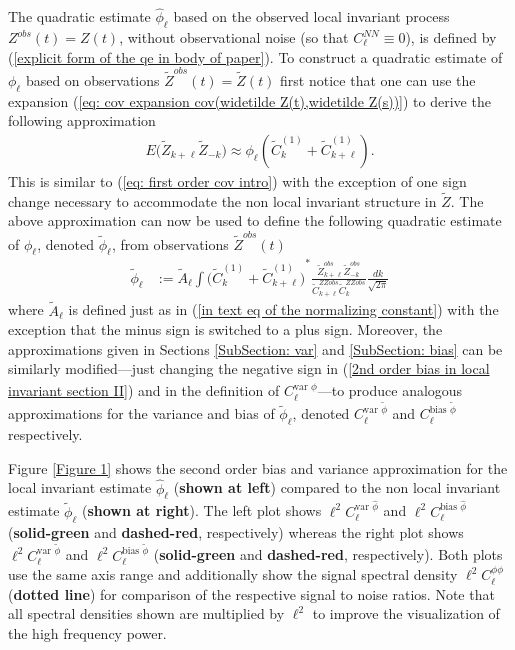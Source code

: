 \documentclass[10pt,noinfoline]{imsart}
\newcommand{\bs}{\boldsymbol}
\begin{document}
The quadratic estimate $\hat\phi_{\ell}$ based on the observed local invariant process $Z^{obs}(t)= Z(t)$, without observational noise (so that $C^{N\!N}_{\ell}\equiv 0$), is defined by (\ref{explicit form of the qe in body of paper}). To construct a quadratic estimate of $\phi_\ell$ based on observations $\widetilde Z^{obs}(t) = \widetilde Z(t)$ first notice that one can use the expansion (\ref{eq: cov expansion cov(widetilde Z(t),widetilde Z(s))}) to derive the following approximation
\begin{align*}
E\big(\widetilde Z_{k+\ell}\widetilde Z_{-k}\big)  \approx  \phi_{\ell}\left( \widetilde C^{(1)}_{k} + \widetilde C_{k+\ell}^{(1)}\right).
\end{align*}
This is similar to
(\ref{eq: first order cov intro}) with the exception of one sign change necessary to accommodate the non local invariant structure in $\widetilde Z$.
The above approximation can now be used to define the following quadratic estimate of $\phi_\ell$, denoted $\widetilde \phi_{\bs \ell}$, from observations $\widetilde Z^{obs}(t)$
\begin{align*}
    \widetilde\phi_{\ell}
    &:=  \widetilde A_{\ell}
        \int
        {\Big(\widetilde C^{{(1)}}_{k} + \widetilde C^{{(1)}}_{k+\ell}\Big)}^{\! *}
        \frac{\widetilde Z^{obs}_{k+\ell}\widetilde Z^{obs}_{-k}}{\widetilde C^{ZZobs}_{k+\ell}\widetilde C^{ZZobs}_{k}}\frac{dk}{\sqrt{2\pi}}
\end{align*}
where $\widetilde A_{\ell}$ is defined just as in (\ref{in text eq of the normalizing constant}) with the exception that the minus sign is switched to a plus sign. Moreover, the approximations given in Sections \ref{SubSection: var} and \ref{SubSection: bias} can be similarly modified---just changing the negative sign in (\ref{2nd order bias in local invariant section II}) and in the definition of $C_{\ell}^{\text{var }\hat \phi}$---to produce analogous approximations for the variance and bias of $\widetilde \phi_{\ell}$, denoted  $C_{\ell}^{\text{var }\widetilde \phi}$ and  $C_{\ell}^{\text{bias }\widetilde \phi}$ respectively.

Figure \ref{Figure 1} shows the second order bias and variance approximation for the local invariant estimate $\hat\phi_{\ell}$ (\textbf{shown at left}) compared to the non local invariant estimate $\widetilde\phi_{\ell}$ (\textbf{shown at right}).
The left plot shows  $\ell^2 C_{\ell}^{\text{var }\hat \phi}$ and $\ell^2 C_{\ell}^{\text{bias }\hat \phi}$ (\textbf{solid-green} and \textbf{dashed-red}, respectively) whereas the right plot shows  $\ell^2 C_{\ell}^{\text{var }\widetilde \phi}$ and  $\ell^2 C_{\ell}^{\text{bias }\widetilde  \phi}$ (\textbf{solid-green} and \textbf{dashed-red}, respectively).
Both plots use the same axis range and additionally show the signal spectral density $\ell^2C^{\phi\phi}_\ell$ (\textbf{dotted line}) for comparison of the respective signal to noise ratios. Note that all spectral densities shown are multiplied by $\ell^2$ to improve the visualization of the high frequency power.
\end{document}
